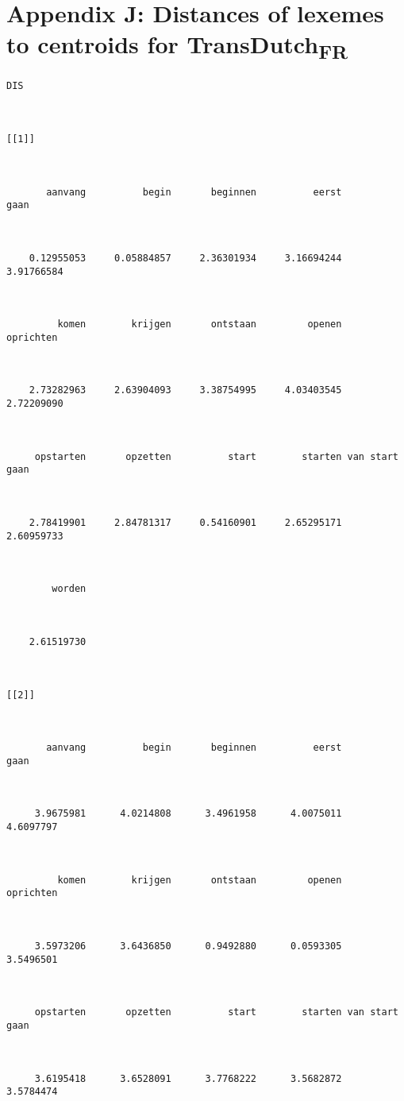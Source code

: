\section*{Appendix J: Distances of lexemes to centroids for TransDutch\textsubscript{FR}}
\begin{lstlisting}
DIS



[[1]]



       aanvang          begin       beginnen          eerst           gaan 



    0.12955053     0.05884857     2.36301934     3.16694244     3.91766584 



         komen        krijgen       ontstaan         openen      oprichten 



    2.73282963     2.63904093     3.38754995     4.03403545     2.72209090 



     opstarten       opzetten          start        starten van start gaan 



    2.78419901     2.84781317     0.54160901     2.65295171     2.60959733 



        worden 



    2.61519730 



[[2]]



       aanvang          begin       beginnen          eerst           gaan 



     3.9675981      4.0214808      3.4961958      4.0075011      4.6097797 



         komen        krijgen       ontstaan         openen      oprichten 



     3.5973206      3.6436850      0.9492880      0.0593305      3.5496501 



     opstarten       opzetten          start        starten van start gaan 



     3.6195418      3.6528091      3.7768222      3.5682872      3.5784474 




\end{lstlisting}
